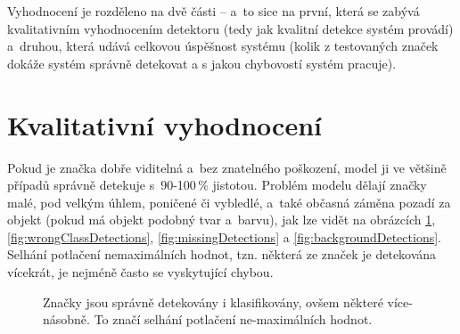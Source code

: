 Vyhodnocení je rozděleno na dvě části -- a~to sice na první, která se zabývá kvalitativním vyhodnocením detektoru (tedy jak kvalitní detekce systém provádí) a~druhou, která udává celkovou úspěšnost systému (kolik z testovaných značek dokáže systém správně detekovat a s jakou chybovostí systém pracuje).


\section{Kvalitativní vyhodnocení}
Pokud je značka dobře viditelná a~bez znatelného poškození, model ji ve většině případů správně detekuje s~90-100$\,\%$ jistotou. Problém modelu dělají značky malé, pod velkým úhlem, poničené či vybledlé, a~také občasná záměna pozadí za objekt (pokud má objekt podobný tvar a~barvu), jak lze vidět na obrázcích \ref{fig:multipleDetections}, \ref{fig:wrongClassDetections}, \ref{fig:missingDetections} a \ref{fig:backgroundDetections}. Selhání potlačení nemaximálních hodnot, tzn. některá ze značek je detekována vícekrát, je nejméně často se vyskytující chybou.

\begin{figure}[H]
    \centering
    \hfill
    \caption{Značky jsou správně detekovány i klasifikovány, ovšem některé více-násobně. To značí selhání potlačení ne-maximálních hodnot.}
    \label{fig:multipleDetections}
\end{figure}

